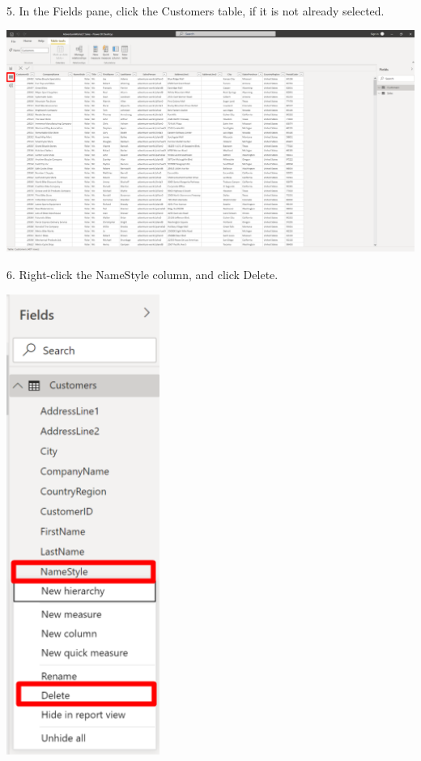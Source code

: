 \documentclass[12pt,letterpaper]{article}
\begin{document}
\\5. In the Fields pane, click the Customers table, if it is not already selected.
\begin{center}
    \includegraphics[width=17cm]{img/22.png}
    \vspace{1cm}  
\end{center}
6. Right-click the NameStyle column, and click Delete.
\begin{center}
    \includegraphics[width=5cm]{img/23.png}
    \vspace{1cm}   
\end{center}
\end{document}
